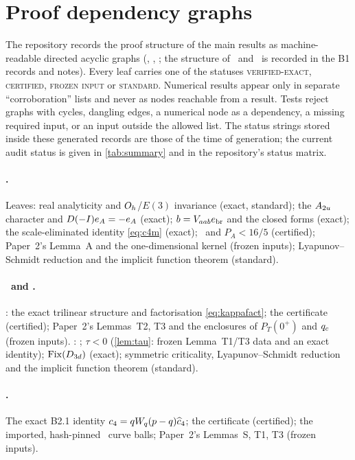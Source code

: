 \section{Proof dependency graphs}\label{app:graphs}

The repository records the proof structure of the main results as machine-readable directed acyclic graphs
(, ,
; the structure of \lemK\ and \propBone\ is recorded in the B1 records and
notes). Every leaf carries one of the statuses \textsc{verified-exact}, \textsc{certified}, \textsc{frozen input} or
\textsc{standard}. Numerical results appear only in separate ``corroboration'' lists and never as nodes reachable from a
result. Tests reject graphs with cycles, dangling edges, a numerical node as a dependency, a missing required input,
or an input outside the allowed list. The status strings stored inside these generated records are those of the time
of generation; the current audit status is given in \cref{tab:summary} and in the repository's status matrix.

\paragraph{\thmA.} Leaves: real analyticity and $O_{h}$/$E(3)$ invariance (exact, standard); the $A_{2u}$ character and
$D(-I)e_{A}=-e_{A}$ (exact); $b=V_{aab}e_{\mathrm{br}}$ and the closed forms (exact); the scale-eliminated identity \eqref{eq:c4m}
(exact); \lemM\ and $P_A<16/5$ (certified); Paper~2's Lemma~A and the one-dimensional kernel (frozen inputs);
Lyapunov--Schmidt reduction and the implicit function theorem (standard).

\paragraph{\lemK\ and \propBone.} \lemK: the exact trilinear structure and factorisation \eqref{eq:kappafact}; the
certificate (certified); Paper~2's Lemmas~T2, T3 and the enclosures of $P_T(0^+)$ and $q_{c}$ (frozen inputs). \propBone:
\lemK; $\tau<0$ (\cref{lem:tau}: frozen Lemma~T1/T3 data and an exact identity); $\operatorname{Fix}(D_{3d})$ (exact); symmetric
criticality, Lyapunov--Schmidt reduction and the implicit function theorem (standard).

\paragraph{\lemQ.} The exact B2.1 identity $c_4=qW_q(p-q)\widehat{c}_4$; the certificate (certified); the imported, hash-pinned
\lemK\ curve balls; Paper~2's Lemmas~S, T1, T3 (frozen inputs).

